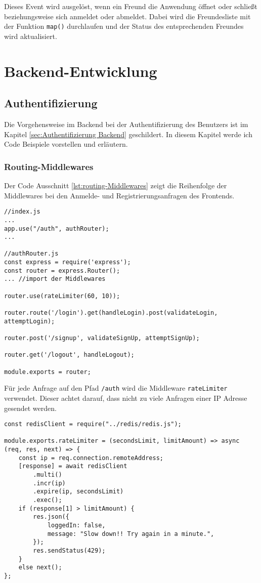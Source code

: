 Dieses Event wird ausgelöst, wenn ein Freund die Anwendung öffnet oder schließt beziehungsweise sich anmeldet oder abmeldet. Dabei wird die Freundesliste mit der Funktion \verb|map()| durchlaufen und der Status des entsprechenden Freundes wird aktualisiert.

    \section{Backend-Entwicklung}
    \subsection{Authentifizierung}
    \label{sec:Backend-auth-impl}
Die Vorgehensweise im Backend bei der Authentifizierung des Benutzers ist im Kapitel \ref{sec:Authentifizierung Backend} geschildert. In diesem Kapitel werde ich Code Beispiele vorstellen und erläutern.

\subsubsection{Routing-Middlewares}
Der Code Ausschnitt \ref{lst:routing-Middlewares} zeigt die Reihenfolge der Middlewares bei den Anmelde- und Registrierungsanfragen des Frontends.
\begin{lstlisting}[style=codeStyle, caption={Ausschnitt aus index.js und die Datei authRouter.js}, label={lst:routing-Middlewares}]
//index.js
...
app.use("/auth", authRouter);
...

//authRouter.js
const express = require('express');
const router = express.Router();
... //import der Middlewares

router.use(rateLimiter(60, 10));

router.route('/login').get(handleLogin).post(validateLogin, attemptLogin);

router.post('/signup', validateSignUp, attemptSignUp);

router.get('/logout', handleLogout);

module.exports = router;
\end{lstlisting}

Für jede Anfrage auf den Pfad \verb|/auth| wird die Middleware \verb|rateLimiter| verwendet. Dieser achtet darauf, dass nicht zu viele Anfragen einer IP Adresse gesendet werden. 

\begin{lstlisting}[style=codeStyle, caption={Die rateLimiter Middleware}, label={lst:rateLimiter}]
const redisClient = require("../redis/redis.js");

module.exports.rateLimiter = (secondsLimit, limitAmount) => async (req, res, next) => {
    const ip = req.connection.remoteAddress;
    [response] = await redisClient
        .multi()
        .incr(ip)
        .expire(ip, secondsLimit)
        .exec();
    if (response[1] > limitAmount) {
        res.json({
            loggedIn: false,
            message: "Slow down!! Try again in a minute.",
        });
        res.sendStatus(429);
    }
    else next();
};
\end{lstlisting}

